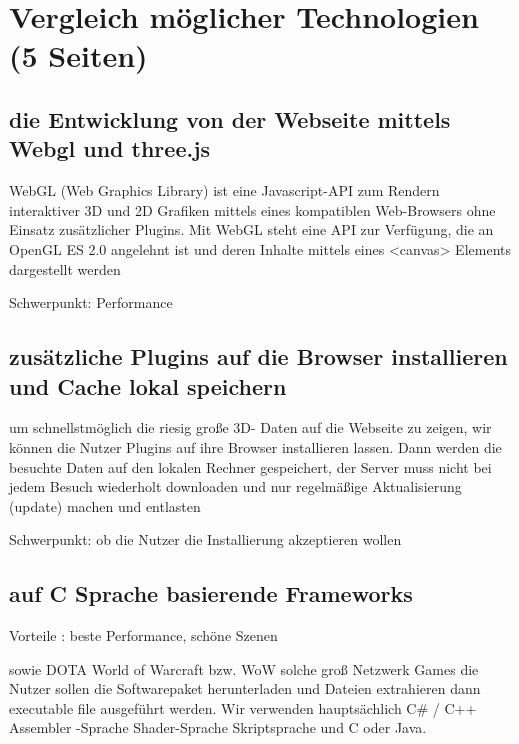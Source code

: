 
\chapter{Vergleich möglicher Technologien (5 Seiten)}


\section{die Entwicklung von der Webseite mittels Webgl und three.js}

WebGL (Web Graphics Library) ist eine Javascript-API zum Rendern interaktiver 3D und 2D Grafiken mittels eines kompatiblen Web-Browsers ohne Einsatz zusätzlicher Plugins. Mit WebGL steht eine API zur Verfügung, die an OpenGL ES 2.0 angelehnt ist und deren Inhalte mittels eines <canvas> Elements dargestellt werden

Schwerpunkt: Performance


\section{zusätzliche Plugins auf die Browser installieren und Cache lokal speichern}

um schnellstmöglich die riesig große 3D- Daten auf die Webseite zu zeigen, wir können die Nutzer Plugins auf ihre Browser installieren lassen. Dann werden die besuchte Daten auf den lokalen Rechner gespeichert, der Server muss nicht bei jedem Besuch wiederholt downloaden und nur regelmäßige Aktualisierung (update) machen und entlasten 

Schwerpunkt: ob die Nutzer die Installierung akzeptieren wollen


\section{auf C Sprache basierende Frameworks}

Vorteile : beste Performance, schöne Szenen

sowie DOTA World of Warcraft  bzw. WoW solche groß Netzwerk Games die Nutzer sollen die Softwarepaket herunterladen
 und Dateien extrahieren dann executable file ausgeführt werden. Wir verwenden hauptsächlich C\# / C++ Assembler 
 -Sprache Shader-Sprache Skriptsprache und C oder Java.

